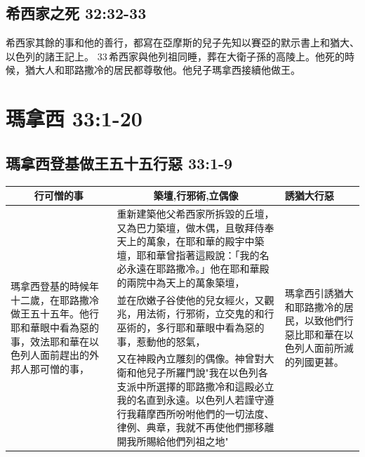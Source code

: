 \subsection{希西家之死 32:32-33}
希西家其餘的事和他的善行，都寫在亞摩斯的兒子先知以賽亞的默示書上和猶大、以色列的諸王記上。 33 希西家與他列祖同睡，葬在大衛子孫的高陵上。他死的時候，猶大人和耶路撒冷的居民都尊敬他。他兒子瑪拿西接續他做王。


\section{瑪拿西 33:1-20 }
\subsection{瑪拿西登基做王五十五行惡 33:1-9}
\begin{table}[H]
\centering
\begin{tabular}{p{2.8cm}|p{12.75cm}|p{2.0cm}}\hline\hline
\multicolumn{1}{c|}{行可憎的事}&\multicolumn{1}{c}{築壇,行邪術,立偶像}&誘猶大行惡\\\hline
\multirow{3}{2.9cm}{瑪拿西登基的時候年十二歲，在耶路撒冷做王五十五年。他行耶和華眼中看為惡的事，效法耶和華在以色列人面前趕出的外邦人那可憎的事，}
&重新建築他父希西家所拆毀的丘壇，又為巴力築壇，做木偶，且敬拜侍奉天上的萬象，在耶和華的殿宇中築壇，耶和華曾指著這殿說：「我的名必永遠在耶路撒冷。」他在耶和華殿的兩院中為天上的萬象築壇， 
&\multirow{3}{2.1cm}{瑪拿西引誘猶大和耶路撒冷的居民，以致他們行惡比耶和華在以色列人面前所滅的列國更甚。}\\\cline{2-2} 
&並在欣嫩子谷使他的兒女經火，又觀兆，用法術，行邪術，立交鬼的和行巫術的，多行耶和華眼中看為惡的事，惹動他的怒氣，&\\\cline{2-2} 
&又在神殿內立雕刻的偶像。神曾對大衛和他兒子所羅門說"我在以色列各支派中所選擇的耶路撒冷和這殿必立我的名直到永遠。以色列人若謹守遵行我藉摩西所吩咐他們的一切法度、律例、典章，我就不再使他們挪移離開我所賜給他們列祖之地"&\\\hline 
\end{tabular}
\end{table} 


